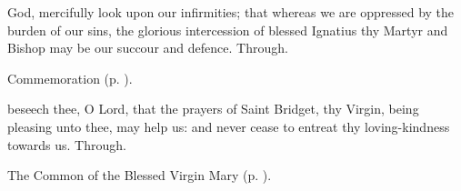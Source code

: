 {} God, mercifully look upon our infirmities; that whereas we are oppressed by the burden of our sins, the glorious intercession of blessed Ignatius thy Martyr and Bishop may be our succour and defence. Through.

\begin{rubric}
    Commemoration  (p. \pageref{BridgetCollect}).
\end{rubric}


\clearpage
{}


\memorialCollect\label{BridgetCollect}
 beseech thee, O Lord, that the prayers of Saint Bridget, thy Virgin, being pleasing unto thee, may help us: and never cease to entreat thy loving-kindness towards us. Through.



\begin{rubric}
	The Common of the Blessed Virgin Mary (p. \pageref{CommonBVM}).
\end{rubric}


